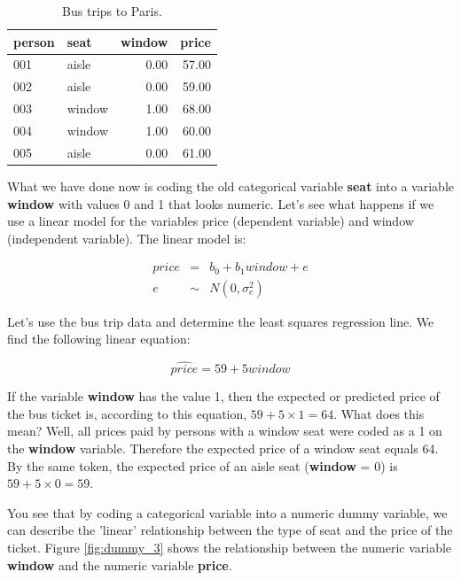\documentclass[]{report}\usepackage[]{graphicx}\usepackage[]{color}
\begin{document}
\begin{table}[ht]
\centering
\caption{Bus trips to Paris.} 
\label{tab:dummy_2}
\begin{tabular}{llrr}
  \hline
person & seat & window & price \\ 
  \hline
001 & aisle & 0.00 & 57.00 \\ 
  002 & aisle & 0.00 & 59.00 \\ 
  003 & window & 1.00 & 68.00 \\ 
  004 & window & 1.00 & 60.00 \\ 
  005 & aisle & 0.00 & 61.00 \\ 
   \hline
\end{tabular}
\end{table}


What we have done now is coding the old categorical variable \textbf{seat} into a variable \textbf{window} with values 0 and 1 that looks numeric. Let's see what happens if we use a linear model for the variables price (dependent variable) and window (independent variable). The linear model is:

\begin{eqnarray}
price &=& b_0 + b_1 window + e \\
e &\sim& N(0,\sigma^2_e)
\end{eqnarray}

Let's use the bus trip data and determine the least squares regression line. We find the following linear equation:


\begin{equation}
\widehat{price} = 59 + 5 window
\end{equation}

If the variable \textbf{window} has the value 1, then the expected or predicted price of the bus ticket is, according to this equation, $59 + 5\times  1= 64$. What does this mean? Well, all prices paid by persons with a window seat were coded as a 1 on the \textbf{window} variable. Therefore the expected price of a window seat equals 64. By the same token, the expected price of an aisle seat (\textbf{window} = 0) is $59 + 5\times 0= 59$.

You see that by coding a categorical variable into a numeric dummy variable, we can describe the 'linear' relationship between the type of seat and the price of the ticket. Figure \ref{fig:dummy_3} shows the relationship between the numeric variable \textbf{window} and the numeric variable \textbf{price}. 
\end{document}
